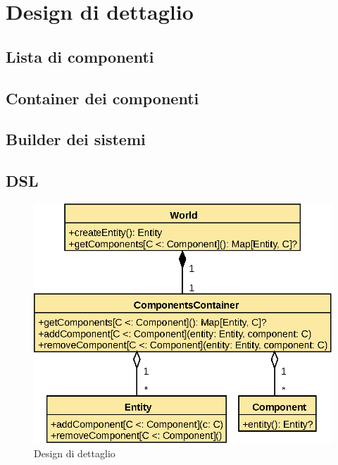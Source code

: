 \chapter{Design di dettaglio}\label{ch:design-di-dettaglio}
\section{Lista di componenti}\label{sec:lista-di-componenti}
\section{Container dei componenti}\label{sec:container-dei-componenti}
\section{Builder dei sistemi}\label{sec:builder-dei-sistemi}
\section{DSL}\label{sec:dsl}

\begin{figure}
    \includegraphics{./img/WorldDetail}
    \caption{Design di dettaglio}
    \label{fig:figure2}
\end{figure}